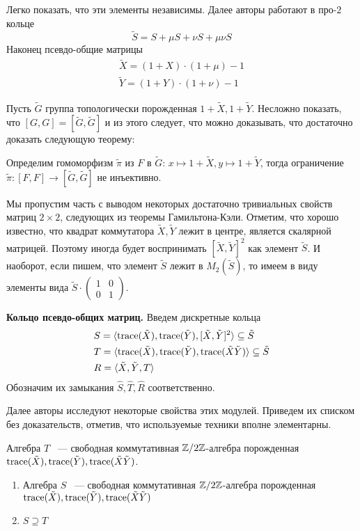 Легко показать, что эти элементы независимы.
Далее авторы работают в про-$2$ кольце
\[
    \tilde{S} = S + \mu S + \nu S + \mu \nu S
\]
Наконец псевдо-общие матрицы
\begin{gather*}
    \tilde{X} = (1 + X) \cdot (1 + \mu) - 1 \\
    \tilde{Y} = (1 + Y) \cdot (1 + \nu) - 1
\end{gather*}

Пусть $\tilde{G}$ группа топологически порожденная $1 + \tilde{X}, 1 + \tilde{Y}$.
Несложно показать, что $[G, G] = [\tilde{G}, \tilde{G}]$ и из этого следует, что можно доказывать, что достаточно доказать следующую теорему:
\vskip 0.1in\noindent
\begin{theorem}
    Определим гомоморфизм $\tilde{\pi}$ из $F$ в $\tilde{G}$: $x\mapsto 1 + \tilde{X}, y\mapsto 1 + \tilde{Y}$, тогда ограничение $\tilde{\pi}: [F, F] \to [\tilde{G}, \tilde{G}]$ не инъективно.
\end{theorem}

Мы пропустим часть с выводом некоторых достаточно тривиальных свойств матриц $2\times 2$, следующих из теоремы Гамильтона-Кэли.
Отметим, что хорошо известно, что квадрат коммутатора $\tilde{X}, \tilde{Y}$ лежит в центре, является скалярной матрицей.
Поэтому иногда будет воспринимать $[\tilde{X},\tilde{Y}]^2$ как элемент $\tilde{S}$.
И наоборот, если пишем, что элемент $\tilde{S}$ лежит в $M_2(\tilde{S})$, то имеем в виду элементы вида $\tilde{S} \cdot
\begin{pmatrix}
    1 & 0 \\
    0 & 1
\end{pmatrix}$.

\vskip 0.1in\noindent
{\large\textbf{Кольцо псевдо-общих матриц.}}
Введем дискретные кольца
\begin{align*}
    & S = \langle \mathrm{trace}(\tilde{X}), \mathrm{trace}(\tilde{Y}), [\tilde{X}, \tilde{Y}]^2 \rangle \subseteq \tilde{S} \\
    & T = \langle \mathrm{trace}(\tilde{X}), \mathrm{trace}(\tilde{Y}), \mathrm{trace}(\tilde{X}\tilde{Y}) \rangle \subseteq \tilde{S} \\
    & R = \langle \tilde{X}, \tilde{Y}, T \rangle
\end{align*}
Обозначим их замыкания $\hat{S}, \hat{T}, \hat{R}$ соответственно.

Далее авторы исследуют некоторые свойства этих модулей.
Приведем их списком без доказательств, отметив, что используемые техники вполне элементарны.

\begin{proposition}
    Алгебра $T$ ~--- свободная коммутативная $\mathbb{Z}/2\mathbb{Z}$-алгебра порожденная $\mathrm{trace}(\tilde{X}), \mathrm{trace}(\tilde{Y}), \mathrm{trace}(\tilde{X}\tilde{Y})$.
\end{proposition}
\begin{proposition}
    \begin{enumerate}
        \item Алгебра $S$ ~--- свободная коммутативная $\mathbb{Z}/2\mathbb{Z}$-алгебра порожденная $\mathrm{trace}(\tilde{X}), \mathrm{trace}(\tilde{Y}), \mathrm{trace}(\tilde{X}\tilde{Y})$
        \item $S\supseteq T$
    \end{enumerate}
\end{proposition}
